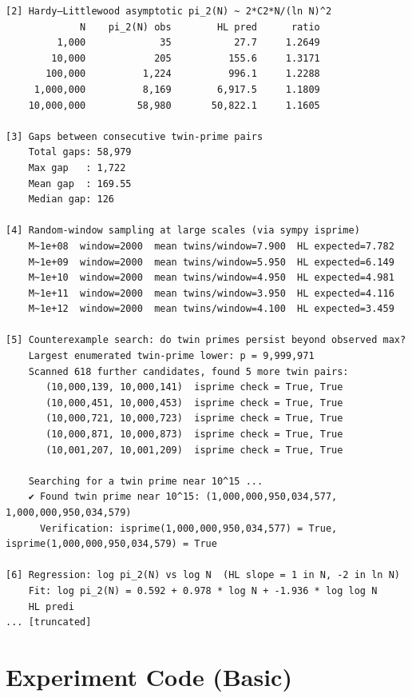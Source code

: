 \documentclass[11pt]{article}
\begin{document}
\begin{lstlisting}
[2] Hardy–Littlewood asymptotic pi_2(N) ~ 2*C2*N/(ln N)^2
             N    pi_2(N) obs        HL pred      ratio
         1,000             35           27.7     1.2649
        10,000            205          155.6     1.3171
       100,000          1,224          996.1     1.2288
     1,000,000          8,169        6,917.5     1.1809
    10,000,000         58,980       50,822.1     1.1605

[3] Gaps between consecutive twin-prime pairs
    Total gaps: 58,979
    Max gap   : 1,722
    Mean gap  : 169.55
    Median gap: 126

[4] Random-window sampling at large scales (via sympy isprime)
    M~1e+08  window=2000  mean twins/window=7.900  HL expected=7.782
    M~1e+09  window=2000  mean twins/window=5.950  HL expected=6.149
    M~1e+10  window=2000  mean twins/window=4.950  HL expected=4.981
    M~1e+11  window=2000  mean twins/window=3.950  HL expected=4.116
    M~1e+12  window=2000  mean twins/window=4.100  HL expected=3.459

[5] Counterexample search: do twin primes persist beyond observed max?
    Largest enumerated twin-prime lower: p = 9,999,971
    Scanned 618 further candidates, found 5 more twin pairs:
       (10,000,139, 10,000,141)  isprime check = True, True
       (10,000,451, 10,000,453)  isprime check = True, True
       (10,000,721, 10,000,723)  isprime check = True, True
       (10,000,871, 10,000,873)  isprime check = True, True
       (10,001,207, 10,001,209)  isprime check = True, True

    Searching for a twin prime near 10^15 ...
    ✔ Found twin prime near 10^15: (1,000,000,950,034,577, 1,000,000,950,034,579)
      Verification: isprime(1,000,000,950,034,577) = True, isprime(1,000,000,950,034,579) = True

[6] Regression: log pi_2(N) vs log N  (HL slope = 1 in N, -2 in ln N)
    Fit: log pi_2(N) = 0.592 + 0.978 * log N + -1.936 * log log N
    HL predi
... [truncated]
\end{lstlisting}


\section{Experiment Code (Basic)}
\end{document}
